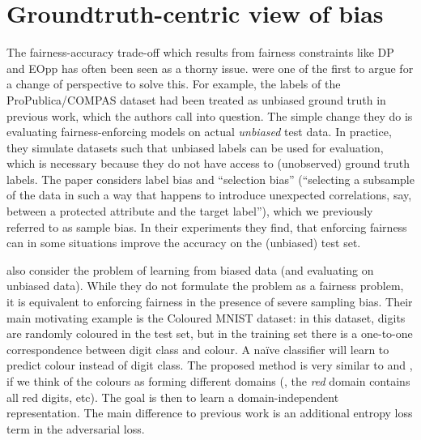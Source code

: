 
\section{Groundtruth-centric view of bias}%
\label{sec:groundtruth-centric-view-of-bias}
The fairness-accuracy trade-off which results from fairness constraints like \ac{DP} and \ac{EOpp}
has often been seen as a thorny issue.
\citet{wick2019unlocking} were one of the first to argue for a change of perspective to solve this.
For example, the labels of the ProPublica/COMPAS dataset had been treated as unbiased ground truth in previous work,
which the authors call into question.
The simple change they do is evaluating fairness-enforcing models on actual \emph{unbiased} test data.
In practice, they simulate datasets such that unbiased labels can be used for evaluation,
which is necessary because they do not have access to (unobserved) ground truth labels.
The paper considers label bias and ``selection bias''
(``selecting a subsample of the data in such a way that happens to introduce unexpected correlations,
say, between a protected attribute and the target label''),
which we previously referred to as sample bias.
In their experiments they find,
that enforcing fairness can in some situations improve the accuracy on the (unbiased) test set.

\citet{kim2019learning} also consider the problem of learning from biased data (and evaluating on unbiased data).
While they do not formulate the problem as a fairness problem,
it is equivalent to enforcing fairness in the presence of severe sampling bias.
Their main motivating example is the Coloured MNIST dataset:
in this dataset, digits are randomly coloured in the test set,
but in the training set there is a one-to-one correspondence between digit class and colour.
A na\"ive classifier will learn to predict colour instead of digit class.
The proposed method is very similar to \citet{ganin2016domain} and \citet{edwards2016censoring},
if we think of the colours as forming different domains
(\ie, the \emph{red} domain contains all red digits, etc).
The goal is then to learn a domain-independent representation.
The main difference to previous work is an additional entropy loss term in the adversarial loss.

